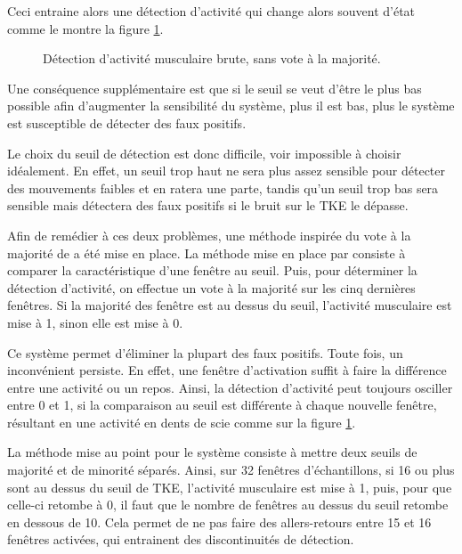 \documentclass[letterpaper, twoside, 12pt, memoire, creativecommons, hyperref]{thETS}
\begin{document}
Ceci entraine alors une détection d'activité qui change alors souvent d'état comme le montre la figure \ref{fig:onsetSansVote}.

\begin{figure}
	\centering
	\caption{Détection d'activité musculaire brute, sans vote à la majorité.}
	\label{fig:onsetSansVote}
\end{figure}

Une conséquence supplémentaire est que si le seuil se veut d'être le plus bas possible afin d'augmenter la sensibilité du système, plus il est bas, plus le système est susceptible de détecter des faux positifs. 

Le choix du seuil de détection est donc difficile, voir impossible à choisir idéalement. En effet, un seuil trop haut ne sera plus assez sensible pour détecter des mouvements faibles et en ratera une parte, tandis qu'un seuil trop bas sera sensible mais détectera des faux positifs si le bruit sur le TKE le dépasse.

Afin de remédier à ces deux problèmes, une méthode inspirée du vote à la majorité de \cite{Chang1996} a été mise en place. La méthode mise en place par \cite{Chang1996} consiste à comparer la caractéristique d'une fenêtre au seuil. Puis, pour déterminer la détection d'activité, on effectue un vote à la majorité sur les cinq dernières fenêtres. Si la majorité des fenêtre est au dessus du seuil, l'activité musculaire est mise à 1, sinon elle est mise à 0.

Ce système permet d'éliminer la plupart des faux positifs. Toute fois, un inconvénient persiste. En effet, une fenêtre d'activation suffit à faire la différence entre une activité ou un repos. Ainsi, la détection d'activité peut toujours osciller entre 0 et 1, si la comparaison au seuil est différente à chaque nouvelle fenêtre, résultant en une activité en dents de scie comme sur la figure \ref{fig:onsetSansVote}.

La méthode mise au point pour le système consiste à mettre deux seuils de majorité et de minorité séparés. Ainsi, sur 32 fenêtres d'échantillons, si 16 ou plus sont au dessus du seuil de TKE, l'activité musculaire est mise à 1, puis, pour que celle-ci retombe à 0, il faut que le nombre de fenêtres au dessus du seuil retombe en dessous de 10. Cela permet de ne pas faire des allers-retours entre 15 et 16 fenêtres activées, qui entrainent des discontinuités de détection.
\end{document}
